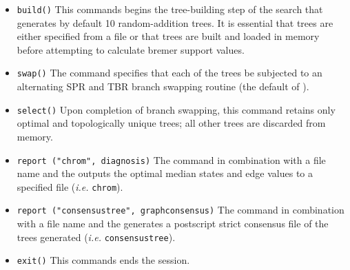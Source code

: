 \begin{itemize}
\item \texttt{build()} This commands begins the tree-building step of the search that generates by default 10 random-addition trees.  It is essential that trees are either specified from a file or that trees are built and loaded in memory before attempting to calculate bremer support values.
\item \texttt{swap()} The  command specifies that each of the trees be subjected to an alternating SPR and TBR branch swapping routine (the default of \poy).
\item \texttt{select()} Upon completion of branch swapping, this command retains only optimal and topologically unique trees; all other trees are discarded from memory. 
\item \texttt{report ("chrom", diagnosis)}  The  command in combination with a file name and the  outputs the optimal median states and edge values to a specified file (\emph{i.e.} \texttt{chrom}). 
\item \texttt{report ("consensustree", graphconsensus)}  The  command in combination with a file name and the  generates a postscript strict consensus file of the trees generated (\emph{i.e.} \texttt{consensustree}). 
\item \texttt{exit()} This commands ends the \poy session.
\end{itemize}





